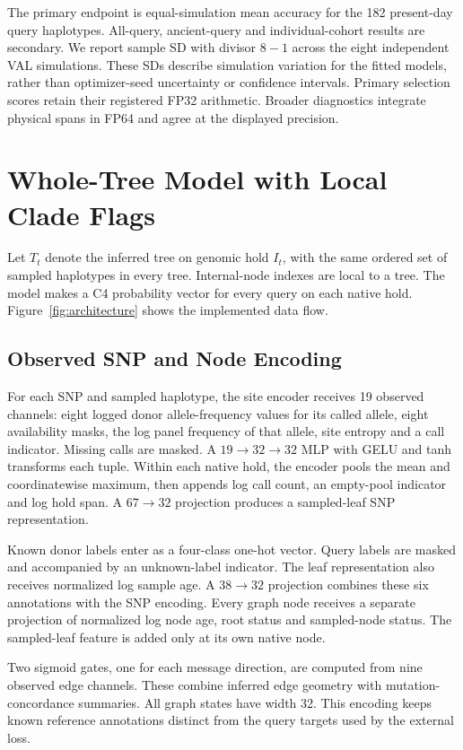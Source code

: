 \documentclass[letterpaper]{article}
\begin{document}
The primary endpoint is equal-simulation mean accuracy for the 182 present-day query haplotypes. All-query, ancient-query and individual-cohort results are secondary. We report sample SD with divisor $8-1$ across the eight independent VAL simulations. These SDs describe simulation variation for the fitted models, rather than optimizer-seed uncertainty or confidence intervals. Primary selection scores retain their registered FP32 arithmetic. Broader diagnostics integrate physical spans in FP64 and agree at the displayed precision.

\section{Whole-Tree Model with Local Clade Flags}
Let $T_t$ denote the inferred tree on genomic hold $I_t$, with the same ordered set of sampled haplotypes in every tree. Internal-node indexes are local to a tree. The model makes a C4 probability vector for every query on each native hold. Figure~\ref{fig:architecture} shows the implemented data flow.

\subsection{Observed SNP and Node Encoding}
For each SNP and sampled haplotype, the site encoder receives 19 observed channels: eight logged donor allele-frequency values for its called allele, eight availability masks, the log panel frequency of that allele, site entropy and a call indicator. Missing calls are masked. A $19\to32\to32$ MLP with GELU and tanh transforms each tuple. Within each native hold, the encoder pools the mean and coordinatewise maximum, then appends log call count, an empty-pool indicator and log hold span. A $67\to32$ projection produces a sampled-leaf SNP representation.

Known donor labels enter as a four-class one-hot vector. Query labels are masked and accompanied by an unknown-label indicator. The leaf representation also receives normalized log sample age. A $38\to32$ projection combines these six annotations with the SNP encoding. Every graph node receives a separate projection of normalized log node age, root status and sampled-node status. The sampled-leaf feature is added only at its own native node.

Two sigmoid gates, one for each message direction, are computed from nine observed edge channels. These combine inferred edge geometry with mutation-concordance summaries. All graph states have width 32. This encoding keeps known reference annotations distinct from the query targets used by the external loss.
\end{document}
